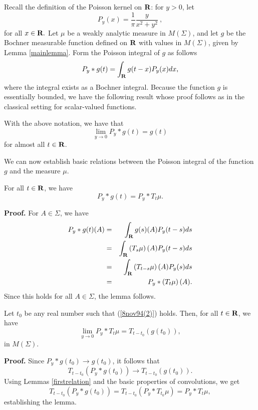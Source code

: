 Recall the definition of the 
Poisson kernel on $\R$:  for $y>0$, let
$$P_y(x)=\frac{1}{\pi} \frac{y}{x^2+y^2}\ ,$$
for all $x\in \R.$  Let $\mu$ be a weakly analytic measure
in $M(\Sigma)$, and let $g$ be the Bochner
measurable function defined on $\R$ with values in  
$M(\Sigma)$, given by Lemma \ref{mainlemma}.  Form the Poisson
integral of $g$ as follows
\begin{equation}
P_y* g(t)=\int_\R g(t-x) P_y(x) dx,
\label{piofg}
\end{equation}
where the integral exists as a Bochner integral.    
Because the function $g$ is essentially bounded, we have the following result
whose proof follows as in the classical 
setting for scalar-valued functions.
\begin{propertyg2}
With the above notation, we 
have that 
\begin{equation}
\lim_{y\rightarrow 0} P_y*g(t)= g(t)
\label{8nov94(2)}
\end{equation}
for almost all $t\in \R$.
\label{propertyg2}
\end{propertyg2}
We can now establish basic relations between 
the Poisson integral of the function $g$ and 
the measure $\mu$.    
\begin{firstrelation}
For all $t\in\R$, we have
$$P_y*g(t)=P_y*T_t\mu .$$
\label{firstrelation}
\end{firstrelation}
{\bf Proof.} For $A\in\Sigma$, we have
\begin{eqnarray*}
P_y*g(t)(A)     &=&     \int_\R g(s)(A)P_y(t-s)ds\\
		&=&     \int_\R\left(T_s\mu\right)(A)P_y(t-s)ds\\
		&=&     \int_\R\left(T_{t-s}\mu\right)(A)P_y(s)ds\\
		&=&     P_y*\left(T_t\mu\right)(A).
\end{eqnarray*}
Since this holds for all $A\in \Sigma$, the lemma follows.
\begin{secondrelation}
Let $t_0$ be any real number such that
(\ref{8nov94(2)}) holds.  Then, for all $t\in \R$, we have
$$\lim_{y\rightarrow 0} P_y*T_t\mu=T_{t-t_0}\left(g(t_0)\right),$$
in $M(\Sigma)$.
\label{secondrelation}
\end{secondrelation}
{\bf Proof.} 
Since $P_y*g(t_0)\rightarrow g(t_0)$, it follows that
$$T_{t-t_0}\left( P_y*g(t_0)\right) 
\rightarrow T_{t-t_0}\left(g(t_0)\right).$$
Using Lemmas \ref{firstrelation} and the basic
properties of convolutions, we get
$$T_{t-t_0}\left( P_y*g(t_0)\right) = T_{t-t_0}\left(P_y*T_{t_0}\mu\right)
=P_y*T_t\mu,$$
establishing the lemma.

